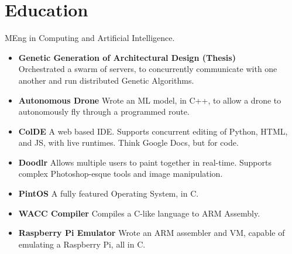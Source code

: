 \documentclass{jcgcv}
\begin{document}
\begin{column}
  \section{Education}
  MEng in Computing and Artificial Intelligence.
  \begin{itemize}
    \item \textbf{Genetic Generation of Architectural Design (Thesis)} \\
          Orchestrated a swarm of servers, to concurrently communicate with
          one another and run distributed Genetic Algorithms.
    \item \textbf{Autonomous Drone} Wrote an ML model, in C++, to allow a drone
          to autonomously fly through a programmed route.
    \item \textbf{ColDE} A web based IDE. Supports concurrent editing of Python,
          HTML, and JS, with live runtimes. Think Google Docs, but for code.
    \item \textbf{Doodlr} Allows multiple users to paint together in real-time. Supports
          complex Photoshop-esque tools and image manipulation.
    \item \textbf{PintOS} A fully featured Operating System, in C.
    \item \textbf{WACC Compiler} Compiles a C-like language to ARM Assembly.
    \item \textbf{Raspberry Pi Emulator} Wrote an ARM assembler and VM, capable
          of emulating a Raspberry Pi, all in C.
  \end{itemize}


\end{column}
\end{document}
